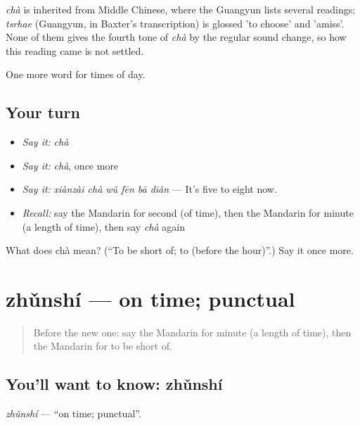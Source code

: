 \begin{cousinweb}
\emph{chà} is inherited from Middle Chinese, where the Guangyun lists several readings; \emph{tsrhae} (Guangyun, in Baxter's transcription) is glossed 'to choose' and 'amiss'. None of them gives the fourth tone of \emph{chà} by the regular sound change, so how this reading came is not settled.
\end{cousinweb}

\begin{grammarlens}[title={What you've built}]
One more word for times of day.
\end{grammarlens}

\subsection*{Your turn}
\begin{itemize}
\raggedright
  \item \emph{Say it:} \emph{chà}
  \item \emph{Say it:} \emph{chà}, once more
  \item \emph{Say it:} \emph{xiànzài chà wǔ fēn bā diǎn} — It's five to eight now.
  \item \emph{Recall:} say the Mandarin for second (of time), then the Mandarin for minute (a length of time), then say \emph{chà} again
\end{itemize}

\begin{tcolorbox}[breakable,colback=teal!4,colframe=teal!35!black,title={Before you move on}]
What does chà mean? (\textquotedblleft{}To be short of; to (before the hour)\textquotedblright{}.) Say it once more.
\end{tcolorbox}
\section[zhǔnshí]{zhǔnshí — on time; punctual}

\label{lesson:ZH-C143-zhunshi}



\begin{quote}
Before the new one: say the Mandarin for minute (a length of time), then the Mandarin for to be short of.
\end{quote}

\subsection*{You'll want to know: zhǔnshí}
\emph{zhǔnshí} — \textquotedblleft{}on time; punctual\textquotedblright{}.

